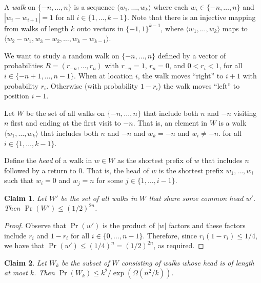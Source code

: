 \documentclass{article}
\newtheorem{clm}{Claim}
\begin{document}
A \emph{walk} on $\{-n,\ldots,n\}$ is a sequence $\langle
w_1,\ldots,w_k\rangle$ where each $w_i\in\{-n,\ldots,n\}$ and
$|w_i-w_{i+1}| = 1$ for all $i\in\{1,\ldots,k-1\}$.  Note that
there is an injective mapping from walks of length $k$ onto vectors
in $\{-1,1\}^{k-1}$, where $\langle w_1,\ldots,w_k\rangle$ maps
to $\langle w_2-w_1,w_3-w_2,\ldots,w_k-w_{k-1}\rangle$.

We want to study a random walk on $\{-n,\ldots,n\}$ defined by a vector
of probabilities $R=(r_{-n},\ldots,r_n)$ with $r_{-n} = 1$, $r_n = 0$,
and $0< r_i < 1$, for all $i \in \{-n+1,...,n-1\}$. When at location $i$,
the walk moves ``right'' to $i+1$ with probability $r_i$.  Otherwise (with
probability $1-r_i$) the walk moves ``left'' to position $i-1$.

Let $W$ be the set of all walks on $\{-n,\ldots,n\}$ that include both $n$
and $-n$ visiting $n$ first and ending at the first visit to $-n$.
That is, an element in $W$ is a walk $\langle w_1,\ldots,w_k\rangle$
that includes both $n$ and $-n$ and $w_k = -n$ and $w_i\neq -n$.
for all $i\in\{1,\ldots,k-1\}$.

Define the \emph{head} of a walk in $w\in W$ as the shortest prefix of $w$ that
includes $n$ followed by a return to 0. That is, the head of $w$ is the
shortest prefix $w_1,\ldots,w_i$ such that $w_i=0$ and $w_j = n$ for some
$j\in\{1,\ldots,i-1\}$.

\begin{clm}\label{claim:one}
Let $W'$ be the set of all walks in $W$ that share some common head $w'$.
Then $\Pr(W') \le (1/2)^{2n}$.
\end{clm}

\begin{proof}
Observe that $\Pr(w')$ is the product of $|w|$ factors and these factors
include $r_i$ and $1-r_i$ for all $i\in\{0,\ldots,n-1\}$.  Therefore,
since $r_i(1-r_i) \le 1/4$, we have that $\Pr(w') \le (1/4)^n =
(1/2)^{2n}$, as required.
\end{proof}


\begin{clm}
Let $W_k$ be the subset of $W$ consisting of walks whose head is of
length at most $k$.  Then $\Pr(W_k) \le k^2 / \exp(\Omega(n^2/k))$.
\end{clm}
\end{document}
